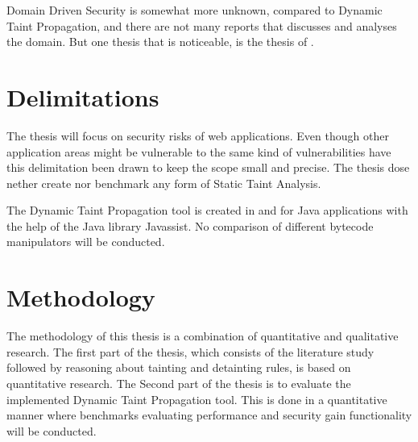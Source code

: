 Domain Driven Security is somewhat more unknown, compared to Dynamic Taint Propagation, and there are not many reports that discusses and analyses the domain. But one thesis that is noticeable, is the thesis of \textcite{Stendahl2016}.


\section{Delimitations}
The thesis will focus on security risks of web applications. Even though other application areas might be vulnerable to the same kind of vulnerabilities have this delimitation been drawn to keep the scope small and precise. The thesis dose nether create nor benchmark any form of Static Taint Analysis. 

The Dynamic Taint Propagation tool is created in and for Java applications with the help of the Java library Javassist. No comparison of different bytecode manipulators will be conducted.

\section{Methodology}
The methodology of this thesis is a combination of quantitative and qualitative research. The first part of the thesis, which consists of the literature study followed by reasoning about tainting and detainting rules, is based on quantitative research. The Second part of the thesis is to evaluate the implemented Dynamic Taint Propagation tool. This is done in a quantitative manner where benchmarks evaluating performance and security gain functionality will be conducted.
